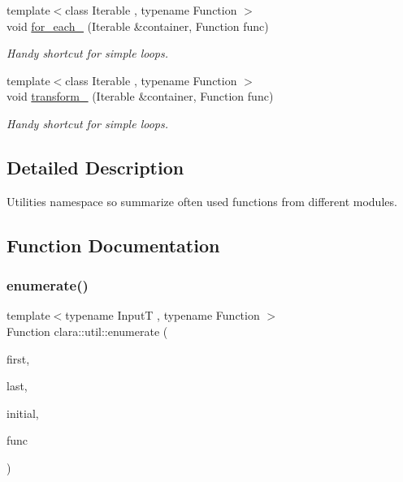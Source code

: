 \begin{DoxyCompactItemize}
{\footnotesize template$<$class Iterable , typename Function $>$ }\\void \hyperlink{namespaceclara_1_1util_a6e0e5139ee6278da7f25b7ea8dd365c1}{for\+\_\+each\+\_\+} (Iterable \&container, Function func)
\begin{DoxyCompactList}\small\item\em Handy shortcut for simple loops. \end{DoxyCompactList}\item 
\mbox{\label{namespaceclara_1_1util_ae295389eee432a78c061a26ad2d373a6}} 
{\footnotesize template$<$class Iterable , typename Function $>$ }\\void \hyperlink{namespaceclara_1_1util_ae295389eee432a78c061a26ad2d373a6}{transform\+\_\+} (Iterable \&container, Function func)
\begin{DoxyCompactList}\small\item\em Handy shortcut for simple loops. \end{DoxyCompactList}\end{DoxyCompactItemize}


\subsection{Detailed Description}
Utilities namespace so summarize often used functions from different modules. 



\subsection{Function Documentation}
\mbox{\label{namespaceclara_1_1util_ab84781d3b94b3ed04f195eab5bb3d02c}} 
\subsubsection{\texorpdfstring{enumerate()}{enumerate()}}
{\footnotesize\ttfamily template$<$typename InputT , typename Function $>$ \\
Function clara\+::util\+::enumerate (\begin{DoxyParamCaption}\item[{InputT}]{first,  }\item[{InputT}]{last,  }\item[{typename std\+::iterator\+\_\+traits$<$ InputT $>$\+::difference\+\_\+type}]{initial,  }\item[{Function}]{func }\end{DoxyParamCaption})}




